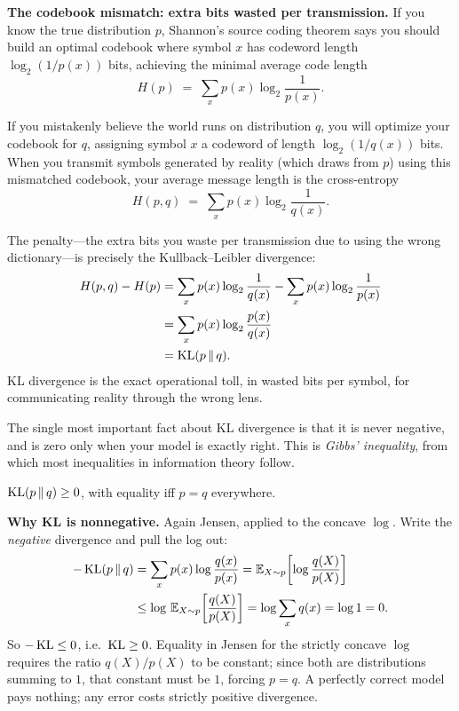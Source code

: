 \begin{intuitionbox}
\textbf{The codebook mismatch: extra bits wasted per transmission.}
If you know the true distribution $p$, Shannon's source coding theorem says you should build an optimal codebook where symbol $x$ has codeword length $\log_2(1/p(x))$ bits, achieving the minimal average code length
\[
  H(p) \;=\; \sum_x p(x)\log_2\frac{1}{p(x)}.
\]

If you mistakenly believe the world runs on distribution $q$, you will optimize your codebook for $q$, assigning symbol $x$ a codeword of length $\log_2(1/q(x))$ bits. When you transmit symbols generated by reality (which draws from $p$) using this mismatched codebook, your average message length is the cross-entropy
\[
  H(p,q) \;=\; \sum_x p(x)\log_2\frac{1}{q(x)}.
\]

The penalty---the extra bits you waste per transmission due to using the wrong dictionary---is precisely the Kullback--Leibler divergence:
\begin{align*}
  H(p,q) - H(p)
  &= \sum_x p(x)\log_2\frac{1}{q(x)} - \sum_x p(x)\log_2\frac{1}{p(x)} \\
  &= \sum_x p(x)\log_2\frac{p(x)}{q(x)} \\
  &= \operatorname{KL}(p \,\|\, q).
\end{align*}
KL divergence is the exact operational toll, in wasted bits per symbol, for communicating reality through the wrong lens.
\end{intuitionbox}

The single most important fact about KL divergence is that it is never negative, and is zero only when
your model is exactly right. This is \emph{Gibbs' inequality}, from which most inequalities in
information theory follow.

\begin{theorem}
\label{ch33:gibbs}
$\operatorname{KL}(p\,\|\,q) \ge 0$, with equality iff $p = q$ everywhere.
\end{theorem}

\begin{whybox}
\textbf{Why KL is nonnegative.} Again Jensen, applied to the concave $\log$. Write the \emph{negative}
divergence and pull the log out:
\[
\begin{aligned}
  -\operatorname{KL}(p\,\|\,q) &= \sum_x p(x)\log\frac{q(x)}{p(x)}
               = \operatorname{\mathbb{E}}_{X\sim p}\!\left[\log\frac{q(X)}{p(X)}\right] \\
               &\le \log\,\operatorname{\mathbb{E}}_{X\sim p}\!\left[\frac{q(X)}{p(X)}\right]
               = \log\sum_x q(x) = \log 1 = 0.
\end{aligned}
\]
So $-\operatorname{KL} \le 0$, i.e.\ $\operatorname{KL} \ge 0$. Equality in Jensen for the strictly concave $\log$ requires the ratio
$q(X)/p(X)$ to be constant; since both are distributions summing to $1$, that constant must be $1$, forcing
$p = q$. A perfectly correct model pays nothing; any error costs strictly positive divergence.
\end{whybox}

